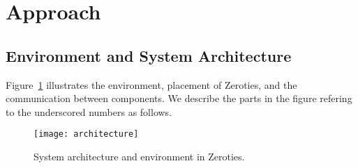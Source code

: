 \section{Approach}
\label{sec:approach}

\subsection{Environment and System Architecture}
\label{sub:architecture}

Figure~\ref{fig:architecture} illustrates the environment, placement of Zeroties, and the communication between components.
We describe the parts in the figure refering to the underscored numbers as follows.

\begin{figure}[h]
    \centering
    \texttt{[image: architecture]}
    \caption{System architecture and environment in Zeroties.}
    \label{fig:architecture}
\end{figure}

